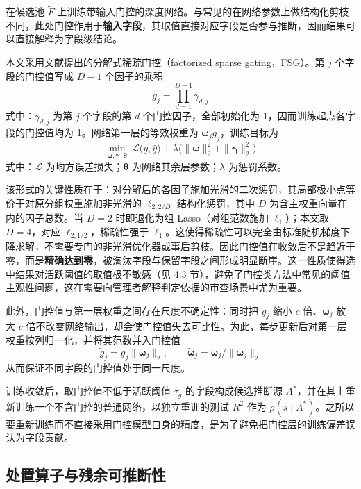 \documentclass[UTF8,zihao=5,twoside]{ctexart}
\begin{document}
在候选池 $\tilde F$ 上训练带输入门控的深度网络。与常见的在网络参数上做结构化剪枝不同，此处门控作用于\textbf{输入字段}，其取值直接对应字段是否参与推断，因而结果可以直接解释为字段级结论。

本文采用文献\cite{ref-dgating}提出的分解式稀疏门控（factorized sparse gating，FSG）。第 $j$ 个字段的门控值写成 $D-1$ 个因子的乘积
\begin{equation}
g_j=\prod_{d=1}^{D-1}\gamma_{d,j}
\end{equation}
式中：$\gamma_{d,j}$ 为第 $j$ 个字段的第 $d$ 个门控因子，全部初始化为 1，因而训练起点各字段的门控值均为 1。网络第一层的等效权重为 $\bm{\omega}_j g_j$，训练目标为
\begin{equation}
\min_{\bm{\omega},\bm{\gamma},\bm{\theta}}\ \mathcal{L}\big(y,\hat y\big)
+\lambda\Big(\|\bm{\omega}\|_2^2+\|\bm{\gamma}\|_2^2\Big)
\end{equation}
式中：$\mathcal{L}$ 为均方误差损失；$\bm{\theta}$ 为网络其余层参数；$\lambda$ 为惩罚系数。

该形式的关键性质在于：对分解后的各因子施加光滑的二次惩罚，其局部极小点等价于对原分组权重施加非光滑的 $\ell_{2,2/D}$ 结构化惩罚\cite{ref-dgating}，其中 $D$ 为含主权重向量在内的因子总数。当 $D=2$ 时即退化为组 Lasso（对组范数施加 $\ell_1$）；本文取 $D=4$，对应 $\ell_{2,1/2}$，稀疏性强于 $\ell_1$。这使得稀疏性可以完全由标准随机梯度下降求解，不需要专门的非光滑优化器或事后剪枝。因此门控值在收敛后不是趋近于零，而是\textbf{精确达到零}，被淘汰字段与保留字段之间形成明显断崖。这一性质使得选中结果对活跃阈值的取值极不敏感（见 4.3 节），避免了门控类方法中常见的阈值主观性问题，这在需要向管理者解释判定依据的审查场景中尤为重要。

此外，门控值与第一层权重之间存在尺度不确定性：同时把 $g_j$ 缩小 $c$ 倍、$\bm{\omega}_j$ 放大 $c$ 倍不改变网络输出，却会使门控值失去可比性。为此，每步更新后对第一层权重按列归一化，并将其范数并入门控值
\begin{equation}
\tilde g_j=g_j\|\bm{\omega}_j\|_2,\qquad
\tilde{\bm{\omega}}_j=\bm{\omega}_j/\|\bm{\omega}_j\|_2
\end{equation}
从而保证不同字段的门控值处于同一尺度。

训练收敛后，取门控值不低于活跃阈值 $\tau_g$ 的字段构成候选推断源 $A^{\ast}$，并在其上重新训练一个不含门控的普通网络，以独立重训的测试 $R^2$ 作为 $\rho(s\mid A^{\ast})$。之所以要重新训练而不直接采用门控模型自身的精度，是为了避免把门控层的训练偏差误认为字段贡献。

\subsection{处置算子与残余可推断性}
\end{document}

